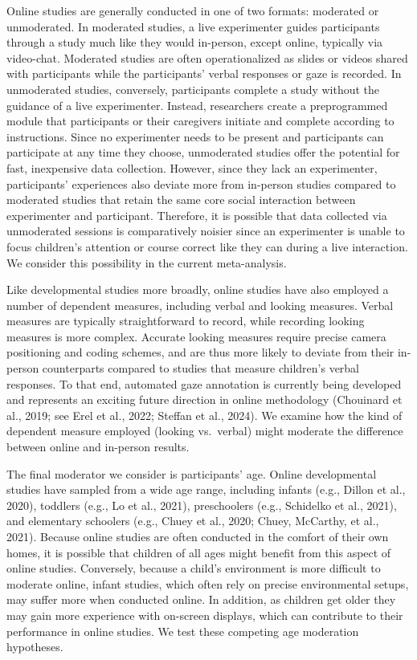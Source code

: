\documentclass[
  man,floatsintext]{apa6}
\begin{document}
Online studies are generally conducted in one of two formats: moderated or unmoderated. In moderated studies, a live experimenter guides participants through a study much like they would in-person, except online, typically via video-chat. Moderated studies are often operationalized as slides or videos shared with participants while the participants' verbal responses or gaze is recorded. In unmoderated studies, conversely, participants complete a study without the guidance of a live experimenter. Instead, researchers create a preprogrammed module that participants or their caregivers initiate and complete according to instructions. Since no experimenter needs to be present and participants can participate at any time they choose, unmoderated studies offer the potential for fast, inexpensive data collection. However, since they lack an experimenter, participants' experiences also deviate more from in-person studies compared to moderated studies that retain the same core social interaction between experimenter and participant. Therefore, it is possible that data collected via unmoderated sessions is comparatively noisier since an experimenter is unable to focus children's attention or course correct like they can during a live interaction. We consider this possibility in the current meta-analysis.

Like developmental studies more broadly, online studies have also employed a number of dependent measures, including verbal and looking measures. Verbal measures are typically straightforward to record, while recording looking measures is more complex. Accurate looking measures require precise camera positioning and coding schemes, and are thus more likely to deviate from their in-person counterparts compared to studies that measure children's verbal responses. To that end, automated gaze annotation is currently being developed and represents an exciting future direction in online methodology (Chouinard et al., 2019; see Erel et al., 2022; Steffan et al., 2024). We examine how the kind of dependent measure employed (looking vs.~verbal) might moderate the difference between online and in-person results.

The final moderator we consider is participants' age. Online developmental studies have sampled from a wide age range, including infants (e.g., Dillon et al., 2020), toddlers (e.g., Lo et al., 2021), preschoolers (e.g., Schidelko et al., 2021), and elementary schoolers (e.g., Chuey et al., 2020; Chuey, McCarthy, et al., 2021). Because online studies are often conducted in the comfort of their own homes, it is possible that children of all ages might benefit from this aspect of online studies. Conversely, because a child's environment is more difficult to moderate online, infant studies, which often rely on precise environmental setups, may suffer more when conducted online. In addition, as children get older they may gain more experience with on-screen displays, which can contribute to their performance in online studies. We test these competing age moderation hypotheses.
\end{document}
